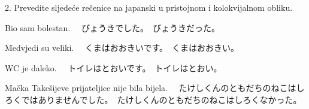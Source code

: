 	\begin{kaitou}[Lv. 2]
	\end{kaitou}
	
	\begin{mondai}{2. Prevedite sljedeće rečenice na japanski u pristojnom i kolokvijalnom obliku.}
		\item Bio sam bolestan. \newline　びょうきでした。　びょうきだった。
		\item Medvjedi su veliki. \newline　くまはおおきいです。　くまはおおきい。
		\item WC je daleko. \newline　トイレはとおいです。　トイレはとおい。
		\item Mačka Takešijeve prijateljice nije bila bijela. \newline　たけしくんのともだちのねこはしろくではありませんでした。　たけしくんのともだちのねこはしろくなかった。
	\end{mondai}
